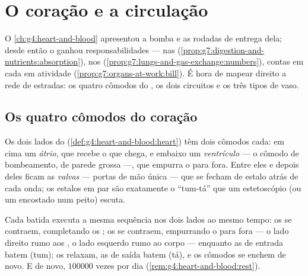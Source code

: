 \chapter{O coração e a circulação}\label{ch:g7:heart-and-circulation}

O \cref{ch:g4:heart-and-blood} apresentou a bomba e as rodadas de
entrega dela; desde então o  ganhou responsabilidades ---
 nas 
(\cref{prop:g7:digestion-and-nutrients:absorption}),  nos
 (\cref{prop:g7:lungs-and-gas-exchange:numbers}), contas em
cada  em atividade (\cref{prop:g7:organs-at-work:bill}). É hora
de mapear direito a rede de estradas: os quatro cômodos do , os
dois circuitos e os três tipos de vaso.

\section{Os quatro cômodos do coração}

\begin{definition}\label{def:g7:heart-and-circulation:rooms}
Os dois lados do  (\cref{def:g4:heart-and-blood:heart}) têm
dois cômodos cada: em cima um \emph{átrio}, que recebe o
 que chega, e embaixo um \emph{ventrículo} ---
o cômodo de bombeamento, de parede grossa ---, que empurra o 
para fora. Entre eles e depois deles ficam as
\emph{valvas} --- portas de mão única --- que se
fecham de estalo atrás de cada onda; os estalos em par são exatamente
o ``tum-tá'' que um estetoscópio (ou um  encostado num peito)
escuta.
\end{definition}

\begin{proposition}\label{prop:g7:heart-and-circulation:beat}
Cada batida executa a mesma sequência nos dois lados ao mesmo tempo:
os  se contraem, completando os ; os  se
contraem, empurrando o  para fora --- o lado direito rumo aos
, o lado esquerdo rumo ao corpo --- enquanto as  de
entrada batem (tum); os  relaxam, as  de saída batem
(tá), e os cômodos se enchem de novo. E de novo, $100000$ vezes por
dia (\cref{rem:g4:heart-and-blood:rest}).
\end{proposition}
\admitted

